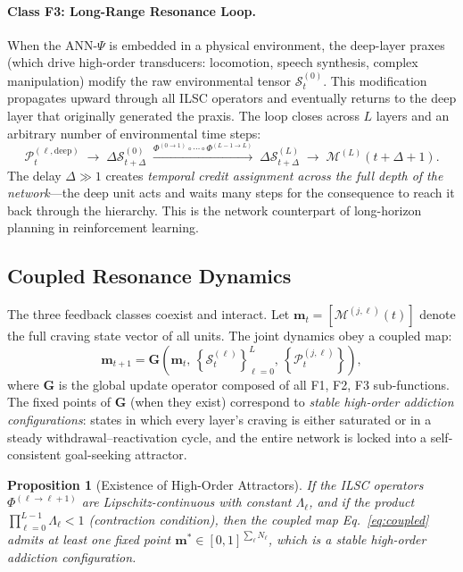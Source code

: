 \documentclass[12pt,a4paper]{article}
\newtheorem{proposition}{Proposition}
\newcommand{\tens}[1]{\boldsymbol{\mathcal{#1}}}
\begin{document}
\paragraph{Class F3: Long-Range Resonance Loop.}
When the ANN-$\Psi$ is embedded in a physical environment, the deep-layer praxes
(which drive high-order transducers: locomotion, speech synthesis, complex
manipulation) modify the raw environmental tensor $\tens{S}_t^{(0)}$. This
modification propagates upward through all ILSC operators and eventually returns
to the deep layer that originally generated the praxis. The loop closes across
$L$ layers and an arbitrary number of environmental time steps:
\begin{equation}
\tens{P}_t^{(\ell,\text{deep})} \;\to\;
\Delta\tens{S}_{t+\Delta}^{(0)} \;\xrightarrow{\Phi^{(0\to1)}\circ\cdots\circ\Phi^{(L-1\to L)}}\;
\Delta\tens{S}_{t+\Delta}^{(L)} \;\to\;
\mathcal{M}^{(L)}(t+\Delta+1).
\label{eq:F3}
\end{equation}
The delay $\Delta \gg 1$ creates \textit{temporal credit assignment across the
full depth of the network}---the deep unit acts and waits many steps for the
consequence to reach it back through the hierarchy. This is the network
counterpart of long-horizon planning in reinforcement learning.

\subsection{Coupled Resonance Dynamics}

The three feedback classes coexist and interact. Let
$\mathbf{m}_t = [\mathcal{M}^{(j,\ell)}(t)]$ denote the full craving state vector
of all units. The joint dynamics obey a coupled map:
\begin{equation}
\mathbf{m}_{t+1} = \mathbf{G}\!\left(
\mathbf{m}_t,\,
\left\{\tens{S}_t^{(\ell)}\right\}_{\ell=0}^{L},\,
\left\{\tens{P}_t^{(j,\ell)}\right\}
\right),
\label{eq:coupled}
\end{equation}
where $\mathbf{G}$ is the global update operator composed of all F1, F2, F3
sub-functions. The fixed points of $\mathbf{G}$ (when they exist) correspond to
\textit{stable high-order addiction configurations}: states in which every layer's
craving is either saturated or in a steady withdrawal--reactivation cycle, and the
entire network is locked into a self-consistent goal-seeking attractor.

\begin{proposition}[Existence of High-Order Attractors]
\label{prop:attractor}
If the ILSC operators $\Phi^{(\ell\to\ell+1)}$ are Lipschitz-continuous with
constant $\Lambda_\ell$, and if the product
$\prod_{\ell=0}^{L-1} \Lambda_\ell < 1$ (contraction condition), then the
coupled map Eq.~\eqref{eq:coupled} admits at least one fixed point
$\mathbf{m}^* \in [0,1]^{\sum_\ell N_\ell}$, which is a stable
high-order addiction configuration.
\end{proposition}
\end{document}
